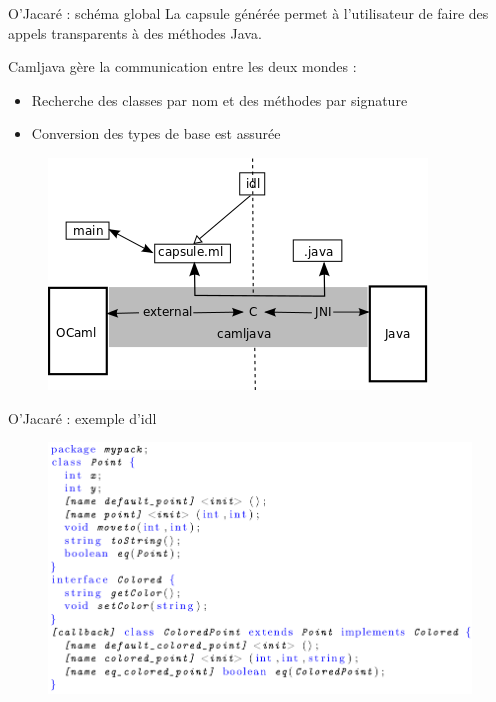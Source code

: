 \documentclass{beamer}
\begin{document}
\begin{frame}{O'Jacaré : schéma global }
La capsule générée permet à l'utilisateur de faire des appels transparents à des méthodes Java.

Camljava gère la communication entre les deux mondes :
\begin{itemize}
\item Recherche des classes par nom et des méthodes par signature
\item Conversion des types de base est assurée
\end{itemize}
\begin{figure}[h]
  \centering
  \includegraphics[scale=0.6]{schemaCamljava2.png}
\end{figure}

\end{frame}







\begin{frame}{O'Jacaré : exemple d'idl}
  
\begin{figure}[h]
  \centering
  \includegraphics[scale=0.35]{pointIdlEx.png}
\end{figure}
\end{frame}
\end{document}

